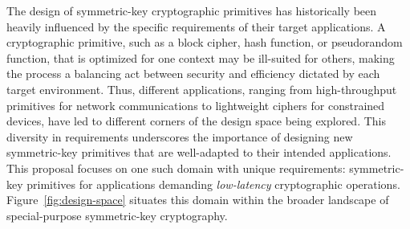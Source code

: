 The design of symmetric-key cryptographic primitives has historically been heavily influenced by the specific requirements of their target applications.
A cryptographic primitive, such as a block cipher, hash function, or pseudorandom function, that is optimized for one context may be ill-suited for others, making the process a balancing act between security and efficiency dictated by each target environment.
Thus, different applications, ranging from high-throughput primitives for network communications to lightweight ciphers for constrained devices, have led to different corners of the design space being explored.
This diversity in requirements underscores the importance of designing new symmetric-key primitives that are well-adapted to their intended applications.
This proposal focuses on one such domain with unique requirements: symmetric-key primitives for applications demanding \emph{low-latency} cryptographic operations.
Figure~\ref{fig:design-space} situates this domain within the broader landscape of special-purpose symmetric-key cryptography.

